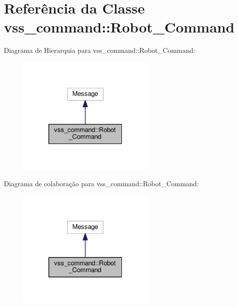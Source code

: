 \hypertarget{classvss__command_1_1Robot__Command}{}\section{Referência da Classe vss\+\_\+command\+:\+:Robot\+\_\+\+Command}
\label{classvss__command_1_1Robot__Command}


Diagrama de Hierarquia para vss\+\_\+command\+:\+:Robot\+\_\+\+Command\+:\nopagebreak
\begin{figure}[H]
\begin{center}
\leavevmode
\includegraphics[width=193pt]{classvss__command_1_1Robot__Command__inherit__graph}
\end{center}
\end{figure}


Diagrama de colaboração para vss\+\_\+command\+:\+:Robot\+\_\+\+Command\+:\nopagebreak
\begin{figure}[H]
\begin{center}
\leavevmode
\includegraphics[width=193pt]{classvss__command_1_1Robot__Command__coll__graph}
\end{center}
\end{figure}
